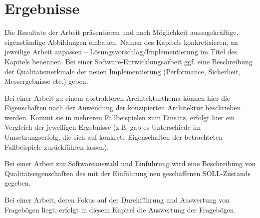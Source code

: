 \chapter{Ergebnisse}
\label{sec:results}

Die Resultate der Arbeit präsentieren und nach Möglichkeit aussagekräftige, eigenständige Abbildungen einbauen. Namen des Kapitels konkretisieren, an jeweilige Arbeit anpassen -- Lösungsvorschlag/Implementierung im Titel des Kapitels benennen.
\makeatletter\ifthesis@masterthesis
Bei einer Soft\-ware-Ent\-wicklungs\-arbeit ggf. eine Beschreibung der Qualitätsmerkmale der neuen Implementierung (Performance, Sicherheit, Messergebnisse etc.) geben.

Bei einer Arbeit zu einem abstrakteren Architekturthema können hier die Eigenschaften nach der Anwendung der konzipierten Architektur beschrieben werden. Kommt sie in mehreren Fallbeispielen zum Einsatz, erfolgt hier ein Vergleich der jeweiligen Ergebnisse (z.B. gab es Unterschiede im Umsetzungserfolg, die sich auf konkrete Eigenschaften der betrachteten Fallbeispiele zurückführen lassen).

Bei einer Arbeit zur Softwareauswahl und Einführung wird eine Beschreibung von Qualitätseigenschaften des mit der Einführung neu geschaffenen SOLL-Zustands gegeben.

Bei einer Arbeit, deren Fokus auf der Durchführung und Auswertung von Fragebögen liegt, erfolgt in diesem Kapitel die Auswertung der Fragebögen.
\fi\makeatother